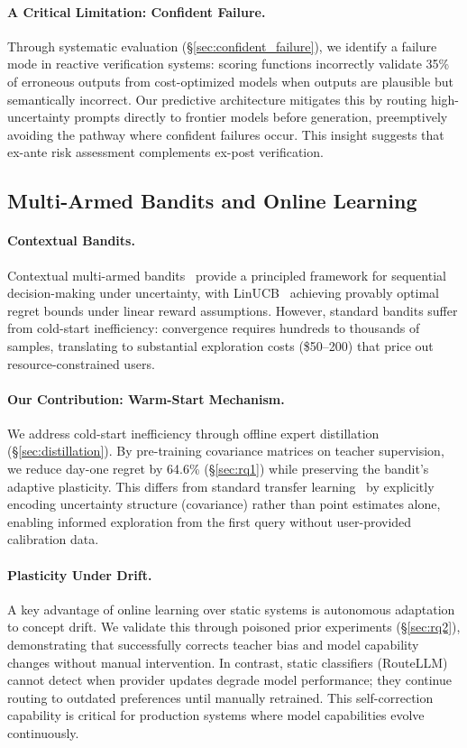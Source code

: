 \paragraph{A Critical Limitation: Confident Failure.} Through systematic evaluation (\S\ref{sec:confident_failure}), we identify a failure mode in reactive verification systems: scoring functions incorrectly validate 35\% of erroneous outputs from cost-optimized models when outputs are plausible but semantically incorrect. Our predictive architecture mitigates this by routing high-uncertainty prompts directly to frontier models before generation, preemptively avoiding the pathway where confident failures occur. This insight suggests that ex-ante risk assessment complements ex-post verification.

\subsection{Multi-Armed Bandits and Online Learning}

\paragraph{Contextual Bandits.} Contextual multi-armed bandits~\cite{li2010contextual,chu2011contextual} provide a principled framework for sequential decision-making under uncertainty, with LinUCB~\cite{li2010contextual} achieving provably optimal regret bounds under linear reward assumptions. However, standard bandits suffer from cold-start inefficiency: convergence requires hundreds to thousands of samples, translating to substantial exploration costs (\$50--200) that price out resource-constrained users.

\paragraph{Our Contribution: Warm-Start Mechanism.} We address cold-start inefficiency through offline expert distillation (\S\ref{sec:distillation}). By pre-training covariance matrices on teacher supervision, we reduce day-one regret by 64.6\% (\S\ref{sec:rq1}) while preserving the bandit's adaptive plasticity. This differs from standard transfer learning~\cite{taylor2009transfer} by explicitly encoding uncertainty structure (covariance) rather than point estimates alone, enabling informed exploration from the first query without user-provided calibration data.

\paragraph{Plasticity Under Drift.} A key advantage of online learning over static systems is autonomous adaptation to concept drift. We validate this through poisoned prior experiments (\S\ref{sec:rq2}), demonstrating that \ours{} successfully corrects teacher bias and model capability changes without manual intervention. In contrast, static classifiers (RouteLLM) cannot detect when provider updates degrade model performance; they continue routing to outdated preferences until manually retrained. This self-correction capability is critical for production systems where model capabilities evolve continuously.

